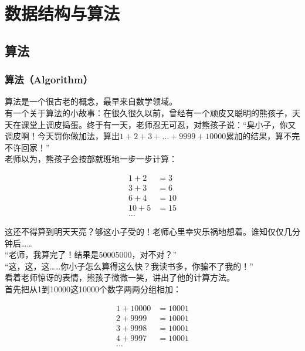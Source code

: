 \chapter{数据结构与算法}

\section{算法}

\subsection{算法（Algorithm）}

算法是一个很古老的概念，最早来自数学领域。\\

有一个关于算法的小故事：在很久很久以前，曾经有一个顽皮又聪明的熊孩子，天天在课堂上调皮捣蛋。终于有一天，老师忍无可忍，对熊孩子说：“臭小子，你又调皮啊！今天罚你做加法，算出$ 1 + 2 + 3 + \dots + 9999 + 10000 $累加的结果，算不完不许回家！” \\

老师以为，熊孩子会按部就班地一步一步计算：

\vspace{-1cm}

\begin{align*}
	1 + 2  & = 3  \\
	3 + 3  & = 6  \\
	6 + 4  & = 10 \\
	10 + 5 & = 15 \\
	\dots
\end{align*}

这还不得算到明天天亮？够这小子受的！老师心里幸灾乐祸地想着。谁知仅仅几分钟后……\\

“老师，我算完了！结果是50005000，对不对？”\\

“这，这，这……你小子怎么算得这么快？我读书多，你骗不了我的！”\\

看着老师惊讶的表情，熊孩子微微一笑，讲出了他的计算方法。\\

首先把从1到10000这10000个数字两两分组相加：

\vspace{-1cm}

\begin{align*}
	1 + 10000 & = 10001 \\
	2 + 9999  & = 10001 \\
	3 + 9998  & = 10001 \\
	4 + 9997  & = 10001 \\
	\dots
\end{align*}

